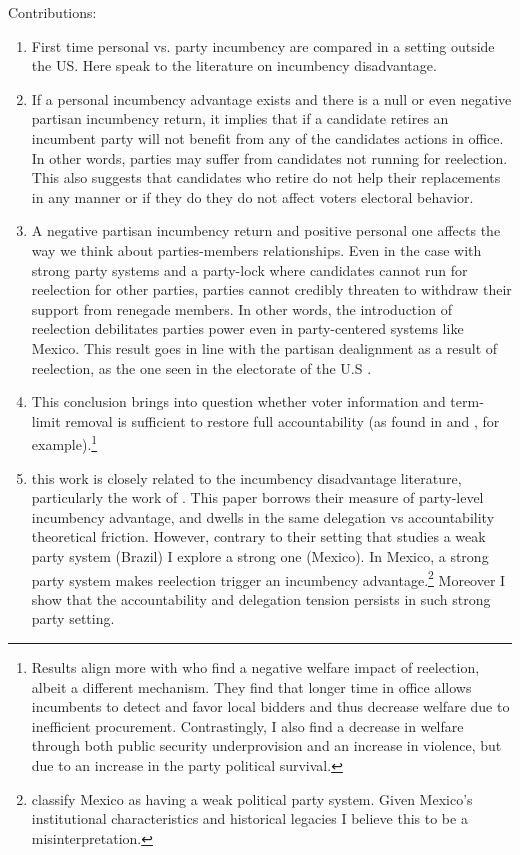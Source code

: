 \documentclass[12pt]{amsart}
\numberwithin{equation}{section}
\theoremstyle{definition}
\theoremstyle{definition}
\theoremstyle{definition}
\begin{document}
Contributions:
\begin{enumerate}
	\item First time personal vs. party incumbency are compared in a setting outside the US. Here speak to the literature on incumbency disadvantage.
	\item If a personal incumbency advantage exists and there is a null or even negative partisan incumbency return, it implies that if a candidate retires an incumbent party will not benefit from any of the candidates actions in office. In other words, parties may suffer from candidates not running for reelection. This also suggests that candidates who retire do not help their replacements in any manner or if they do they do not affect voters electoral behavior. 
	\item A negative partisan incumbency return and positive personal one affects the way we think about parties-members relationships. Even in the case with strong party systems and a party-lock where candidates cannot run for reelection for other parties, parties cannot credibly threaten to withdraw their support from renegade members. In other words, the introduction of reelection debilitates parties power even in party-centered systems like Mexico. This result goes in line with the partisan dealignment as a result of reelection, as the one seen in the electorate of the U.S  \citep{cox_katz_1996}.   

	 
	\item This conclusion brings into question whether voter information and term-limit removal is sufficient to restore full accountability (as found in \citet{ferraz_finan_2011} and \citet{alt_etal_2011}, for example).\footnote{Results align more with \citet{coviello_etal_2017} who  find a negative welfare impact of reelection, albeit a different mechanism. They find that longer time in office allows incumbents to detect and favor local bidders and thus decrease welfare due to inefficient procurement. Contrastingly, I also find a decrease in welfare through both public security underprovision and an increase in violence, but due to an increase in the party political survival.}
	\item this work is closely related to the incumbency disadvantage literature, particularly the work of \citet{klasnja_titiunik_2017}. This paper borrows their measure of party-level incumbency advantage, and dwells in the same delegation vs accountability theoretical friction. However, contrary to their setting that studies a weak party system (Brazil) I explore a strong one (Mexico). In Mexico, a strong party system makes reelection trigger an incumbency advantage.\footnote{\citet{klasnja_titiunik_2017} classify Mexico as having a weak political party system. Given Mexico's institutional characteristics and historical legacies I believe this to be a misinterpretation.}  Moreover I show that the accountability and delegation tension persists in such strong party setting. 
\end{enumerate}
\end{document}
